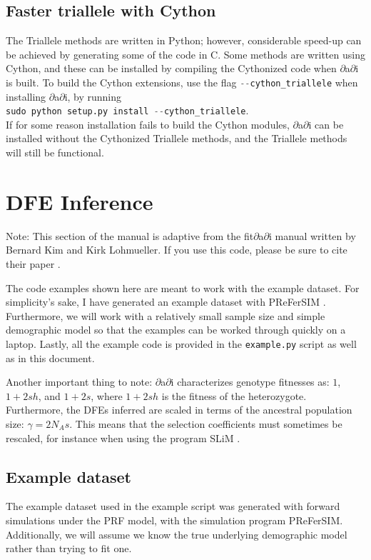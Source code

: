 \documentclass[12pt]{article}
\makeatletter
\newcommand{\dadi}{$\partial$a$\partial$i\xspace}
\newcommand{\py}[1]{\lstinline[language=Python, showstringspaces=False]@#1@}
\makeatother
\begin{document}
\subsection{Faster triallele with Cython}
The Triallele methods are written in Python; however, considerable speed-up can be achieved by generating some of the code in C.
Some methods are written using Cython, and these can be installed by compiling the Cythonized code when \dadi is built.
To build the Cython extensions, use the flag \py{--cython_triallele} when installing \dadi, by running\\
\py{sudo python setup.py install --cython_triallele}.\\
If for some reason installation fails to build the Cython modules, \dadi can be installed without the Cythonized Triallele methods, and the Triallele methods will still be functional.


\section{DFE Inference}

Note: This section of the manual is adaptive from the fit$\partial$a$\partial$i manual written by Bernard Kim and Kirk Lohmueller. If you use this code, please be sure to cite their paper \cite{Kim2017}.

The code examples shown here are meant to work with the example dataset. For simplicity's sake, I have generated an example dataset with PReFerSIM \cite{ortega2016}. Furthermore, we will work with a relatively small sample size and simple demographic model so that the examples can be worked through quickly on a laptop. Lastly, all the example code is provided in the \texttt{example.py} script as well as in this document.

Another important thing to note: $\partial$a$\partial$i characterizes genotype fitnesses as: $1$, $1+2sh$, and $1+2s$, where $1+2sh$ is the fitness of the heterozygote. Furthermore, the DFEs inferred are scaled in terms of the ancestral population size: $\gamma=2N_{A}s$. This means that the selection coefficients must sometimes be rescaled, for instance when using the program SLiM \cite{haller2016}.

\subsection{Example dataset}
The example dataset used in the example script was generated with forward simulations under the PRF model, with the simulation program PReFerSIM. Additionally, we will assume we know the true underlying demographic model rather than trying to fit one.
\end{document}
